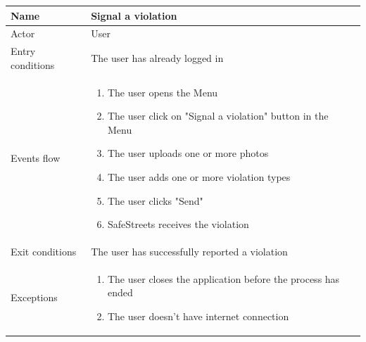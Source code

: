 \documentclass{article}
\begin{document}
\begin{table}[H]
    \begin{tabular}{|l|l|}
    \hline
     Name & \begin{minipage}[t]{0.7\textwidth} Signal a violation\end{minipage}
     \\ \hline  
     Actor & \begin{minipage}[t]{0.7\textwidth} User\end{minipage} \\ \hline 
     Entry conditions & \begin{minipage}[t]{0.7\textwidth} The user has already
     logged in \end{minipage} \\ \hline 
     Events flow & \begin{minipage}[t]{0.7\textwidth}
    \begin{enumerate}
        \item The user opens the Menu
        \item The user click on "Signal a violation" button in the Menu
        \item The user uploads one or more photos
        \item The user adds one or more violation types
        \item The user clicks "Send"
        \item SafeStreets receives the violation
    \end{enumerate}
    \end{minipage} \\ \hline
     Exit conditions & \begin{minipage}[t]{0.7\textwidth}The user has
     successfully reported a violation \end{minipage} \\ \hline
     Exceptions & \begin{minipage}[t]{0.7\textwidth}
    \begin{enumerate}
        \item The user closes the application before the process has ended 
        \item The user doesn't have internet connection 
    \end{enumerate}    
    \end{minipage} \\ \hline
    \end{tabular}
\end{table}
\end{document}
